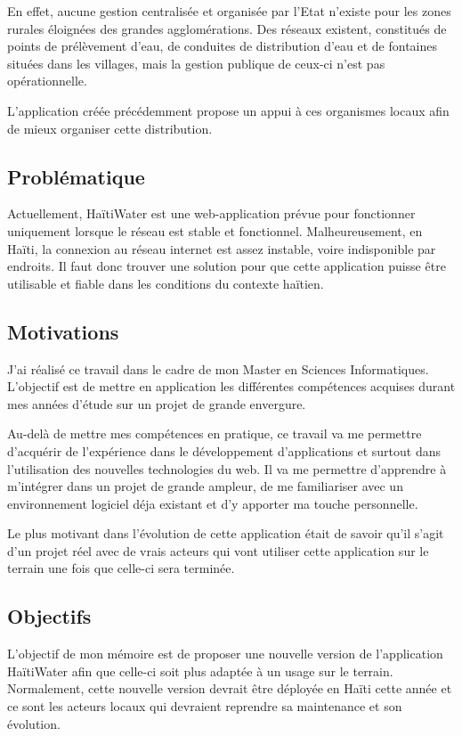 \documentclass{EPL-master-thesis-covers-FR}
\begin{document}
			 En effet, aucune gestion centralisée et organisée par l'Etat n'existe pour les zones rurales éloignées des grandes agglomérations. Des réseaux existent, constitués de points de prélèvement d'eau, de conduites de distribution d'eau et de fontaines situées dans les villages, mais la gestion publique de ceux-ci n'est pas opérationnelle. 

			L'application créée précédemment \cite{ref:haitiwater} propose un appui à ces organismes locaux afin de mieux organiser cette distribution. 

			

		\subsection*{Problématique}
			Actuellement, HaïtiWater est une web-application prévue pour fonctionner uniquement lorsque le réseau est stable et fonctionnel. Malheureusement, en Haïti, la connexion au réseau internet est assez instable, voire indisponible par endroits. Il faut donc trouver une solution pour que cette application puisse être utilisable et fiable dans les conditions du contexte haïtien. 


		\subsection*{Motivations}
			J'ai réalisé ce travail dans le cadre de mon Master en Sciences Informatiques. L'objectif est de mettre en application les différentes compétences acquises durant mes années d'étude sur un projet de grande envergure.
			
			Au-delà de mettre mes compétences en pratique, ce travail va me permettre d'acquérir de l'expérience dans le développement d'applications et surtout dans l'utilisation des nouvelles technologies du web. Il va me permettre d'apprendre à m'intégrer dans un projet de grande ampleur, de me familiariser avec un environnement logiciel déja existant et d'y apporter ma touche personnelle.	
			
			Le plus motivant dans l'évolution de cette application était de savoir qu'il s'agit d'un projet réel avec de vrais acteurs qui vont utiliser cette application sur le terrain une fois que celle-ci sera terminée.


		\subsection*{Objectifs}
			L'objectif de mon mémoire est de proposer une nouvelle version de l'application HaïtiWater afin que celle-ci soit plus adaptée à un usage sur le terrain. Normalement, cette nouvelle version devrait être déployée en Haïti cette année et ce sont les acteurs locaux qui devraient reprendre sa maintenance et son évolution.
			
\end{document}

